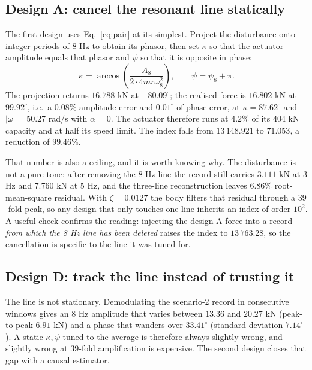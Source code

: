 \documentclass[12pt]{apmcmthesis}
\begin{document}
\subsection{Design A: cancel the resonant line statically}
The first design uses Eq.~\eqref{eq:pair} at its simplest. Project the disturbance onto integer
periods of $8$ Hz to obtain its phasor, then set $\kappa$ so that the actuator amplitude equals
that phasor and $\psi$ so that it is opposite in phase:
\begin{equation}
\kappa=\arccos\!\left(\frac{A_8}{2\cdot 4mr\omega_8^2}\right),\qquad
\psi=\psi_8+\pi .
\end{equation}
The projection returns $16.788$ kN at $-80.09^\circ$; the realised force is $16.802$ kN at
$99.92^\circ$, i.e.\ a $0.08\%$ amplitude error and $0.01^\circ$ of phase error, at
$\kappa=87.62^\circ$ and $|\omega|=50.27$ rad/s with $\alpha=0$. The actuator therefore runs at
$4.2\%$ of its $404$ kN capacity and at half its speed limit. The index falls from $13\,148.921$
to $\mathbf{71.053}$, a reduction of $99.46\%$.

That number is also a ceiling, and it is worth knowing why. The disturbance is not a pure tone:
after removing the $8$ Hz line the record still carries $3.111$ kN at $3$ Hz and $7.760$ kN at
$5$ Hz, and the three-line reconstruction leaves $6.86\%$ root-mean-square residual. With
$\zeta=0.0127$ the body filters that residual through a $39$-fold peak, so any design that only
touches one line inherits an index of order $10^2$. A useful check confirms the reading: injecting
the design-A force into a record \emph{from which the 8 Hz line has been deleted} raises the index
to $13\,763.28$, so the cancellation is specific to the line it was tuned for.

\subsection{Design D: track the line instead of trusting it}
The line is not stationary. Demodulating the scenario-2 record in consecutive windows gives an
$8$ Hz amplitude that varies between $13.36$ and $20.27$ kN (peak-to-peak $6.91$ kN) and a phase
that wanders over $33.41^\circ$ (standard deviation $7.14^\circ$). A static $\kappa,\psi$ tuned to
the average is therefore always slightly wrong, and slightly wrong at $39$-fold amplification is
expensive. The second design closes that gap with a causal estimator.
\end{document}
